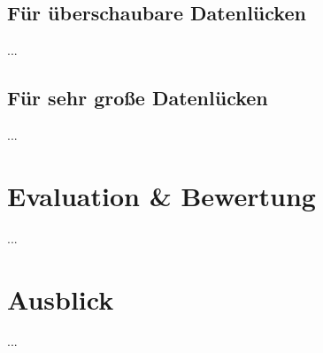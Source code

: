 \documentclass[11pt,a4paper,twocolumn]{article}
\begin{document}
\subsection{Für überschaubare Datenlücken}
...

\subsection{Für sehr große Datenlücken}
...

\section{Evaluation \& Bewertung}
...

\section{Ausblick}
...



\end{document}
